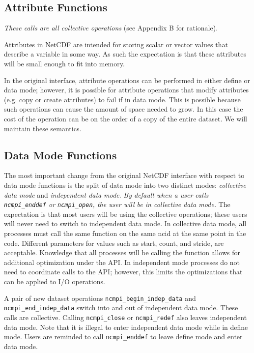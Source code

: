 \documentclass[10pt]{article}
\begin{document}
\subsection{Attribute Functions}

\emph{These calls are all collective operations} (see Appendix B for
rationale).

Attributes in NetCDF are intended for storing scalar or vector values that
describe a variable in some way.  As such the expectation is that these
attributes will be small enough to fit into memory.

In the original interface, attribute operations can be performed in either
define or data mode; however, it is possible for attribute operations that
modify attributes (e.g. copy or create attributes) to fail if in data mode.
This is possible because such operations can cause the amount of space needed
to grow.  In this case the cost of the operation can be on the order of a copy
of the entire dataset.  We will maintain these semantics.

\subsection{Data Mode Functions}

The most important change from the original NetCDF interface with respect to
data mode functions is the split of data mode into two distinct modes:
\emph{collective data mode} and \emph{independent data mode}.  \emph{By default when
a user calls \texttt{ncmpi\_enddef} or \texttt{ncmpi\_open}, the user will be
in collective data mode.}  The expectation is that most users will be using the
collective operations; these users will never need to switch to independent
data mode.  In collective data mode, all processes must call the same function
on the same ncid at the same point in the code.  Different parameters for
values such as start, count, and stride, are acceptable.  Knowledge that all
processes will be calling the function allows for additional optimization
under the API.  In independent mode processes do not need to coordinate calls
to the API; however, this limits the optimizations that can be applied to I/O operations.

A pair of new dataset operations \texttt{ncmpi\_begin\_indep\_data} and
\texttt{ncmpi\_end\_indep\_data} switch into and out of independent data mode.
These calls are collective.  Calling \texttt{ncmpi\_close} or
\texttt{ncmpi\_redef} also leaves independent data mode.
Note that it is illegal to enter independent data mode while in define mode.
Users are reminded to call {\tt ncmpi\_enddef} to leave define mode and enter data mode.
\end{document}
